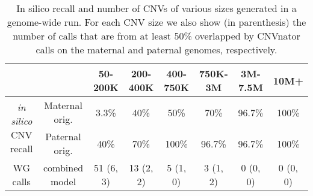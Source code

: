 \begin{table}[t]
\centering
\begin{tabular}{c|c|c|c|c|c|c|c}
	&		&	50-200K	&	200-400K	&	400-750K	&	750K-3M	&	3M-7.5M	&	10M+ \\ \hline
\multirow{2}{*}{\emph{in silico} CNV recall}	&	Maternal orig.	&	3.3\%	&	40\%	&	50\%	&	70\%	&	96.7\%	&	100\%	\\
	&	Paternal orig.	&	40\%	&	70\%	&	100\%	&	96.7\%	&	96.7\%	&	100\%	\\ \hline
WG calls	&	combined model	&	51 (6, 3)	&	13 (2, 2)	&	5 (1, 0)	&	3 (1, 2)	&	0 (0, 0)	&	0 (0, 0)	\\
\end{tabular}
\vspace{3pt}
\caption{In silico recall and number of CNVs of various sizes generated in a genome-wide run. For each CNV size we also show (in parenthesis) the number of calls that are from at least 50\% overlapped by CNVnator \cite{abyzov2011cnvnator} calls on the maternal and paternal genomes, respectively.}
\label{tab:resWGS} 
\end{table}
\vspace{1cm}



